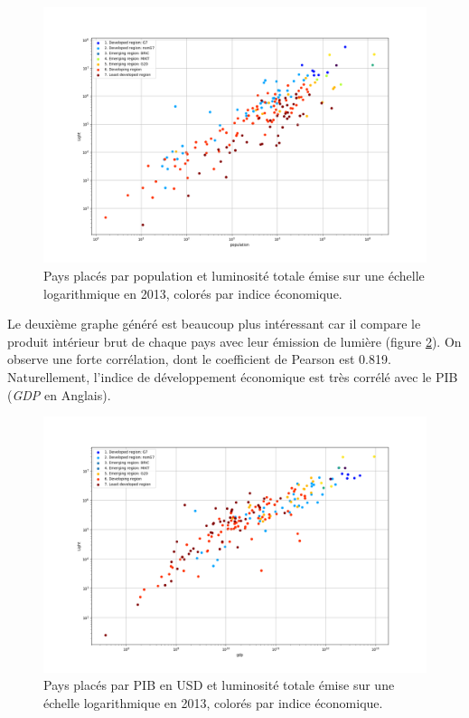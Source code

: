 \documentclass[a4paper, 11pt]{report}
\begin{document}
\begin{figure}
	\centering
	\includegraphics[width=1.0\textwidth]{img/population-light.png}
	\caption{Pays placés par population et luminosité totale émise sur une échelle logarithmique en 2013, colorés par indice économique.}
	\label{country_lightpop_scatter}
\end{figure}

Le deuxième graphe généré est beaucoup plus intéressant car il compare le produit intérieur brut de chaque pays avec leur émission de lumière (figure \ref{country_gdppop_scatter}). On observe une forte corrélation, dont le coefficient de Pearson est 0.819.
Naturellement, l'indice de développement économique est très corrélé avec le PIB (\textit{GDP} en Anglais).

\begin{figure}
	\centering
	\includegraphics[width=1.0\textwidth]{img/gdp-light.png}
	\caption{Pays placés par PIB en USD et luminosité totale émise sur une échelle logarithmique en 2013, colorés par indice économique.}
	\label{country_gdppop_scatter}
\end{figure}
\end{document}
